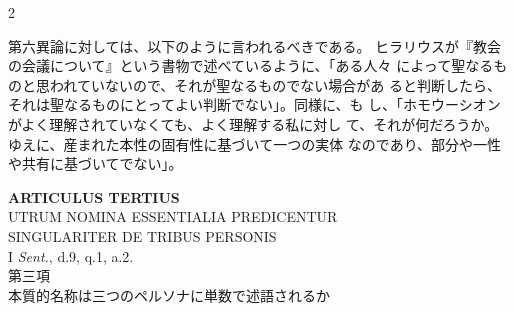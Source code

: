 \documentclass[paper=a4paper,fontsize=10pt,jafontsize=9pt,titlepage]{jlreq}
\begin{document}
\begin{paracol}{2}
\switchcolumn

第六異論に対しては、以下のように言われるべきである。
ヒラリウスが『教会の会議について』という書物で述べているように、「ある人々
 によって聖なるものと思われていないので、それが聖なるものでない場合があ
 ると判断したら、それは聖なるものにとってよい判断でない」。同様に、も
 し、「ホモウーシオンがよく理解されていなくても、よく理解する私に対し
 て、それが何だろうか。ゆえに、産まれた本性の固有性に基づいて一つの実体
 なのであり、部分や一性や共有に基づいてでない」。

\switchcolumn*

\end{paracol}
\newpage




\begin{center}
 {\Large {\bfseries ARTICULUS TERTIUS}}\\
 {\large UTRUM NOMINA ESSENTIALIA PREDICENTUR\\SINGULARITER DE TRIBUS PERSONIS}\\
 {\footnotesize I {\itshape Sent.}, d.9, q.1, a.2.}\\
 {\Large 第三項\\本質的名称は三つのペルソナに単数で述語されるか}
\end{center}
\end{document}
